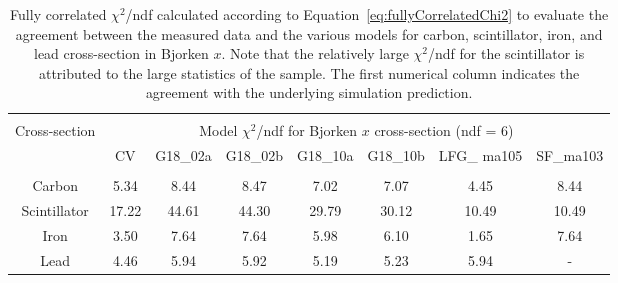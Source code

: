 \begin{table}[b!]
    \vspace{-18pt}
    \centering
    \begin{adjustbox}{width=1.01\textwidth,center=\textwidth}
    \begin{tabular}{c  c c c c c c c}
    \hline \\ [-1.5 ex]
    \multirow[c]{2}{*}{Cross-section} & \multicolumn{7}{c}{Model $\chi^2$/ndf for Bjorken $x$ cross-section (ndf = 6) } \\ [0.8ex]
    & CV & G18\_02a & G18\_02b & G18\_10a & G18\_10b & LFG\_ ma105 & SF\_ma103\\ [0.5ex] %
    \hline
    \hline \\[-1.9ex]
    Carbon & 5.34 & 8.44 & 8.47 & 7.02 & 7.07 & 4.45 & 8.44\\
    Scintillator & 17.22 & 44.61 & 44.30 & 29.79 & 30.12 & 10.49 & 10.49 \\
    Iron & 3.50 & 7.64 & 7.64 & 5.98 & 6.10 & 1.65 & 7.64 \\
    Lead & 4.46 & 5.94 & 5.92 & 5.19 & 5.23 & 5.94 & - \\
    \hline
    \end{tabular}
    \end{adjustbox}
    \caption{Fully correlated $\chi^2$/ndf calculated according to Equation~\ref{eq:fullyCorrelatedChi2} to evaluate the agreement between the measured data and the various models for carbon, scintillator, iron, and lead cross-section in Bjorken $x$. Note that the relatively large $\chi^2$/ndf for the scintillator is attributed to the large statistics of the sample. The first numerical column indicates the agreement with the underlying simulation prediction.}
    \label{table:xsec_modelComparison_x}
\end{table}
\clearpage
